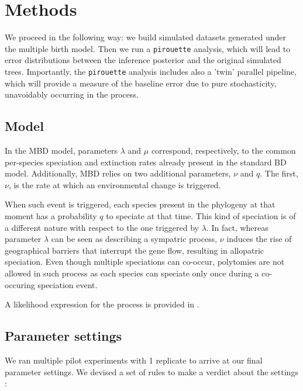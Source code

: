 \section{Methods}

We proceed in the following way: we build simulated datasets generated under the multiple birth model. Then we run a \verb;pirouette; analysis, which will lead to error distributions between the inference posterior and the original simulated trees. Importantly, the \verb;pirouette; analysis includes also a 'twin' parallel pipeline, which will provide a measure of the baseline error due to pure stochasticity, unavoidably occurring in the process.

\subsection{Model}

In the MBD model, parameters $\lambda$ and $\mu$ correspond, respectively, 
to the common per-species speciation and extinction rates 
already present in the standard BD model. 
Additionally, MBD relies on two additional parameters, $\nu$ and $q$. 
The first, $\nu$, is the rate at which an environmental change is triggered.

When such event is triggered, each species present in the phylogeny 
at that moment has a probability $q$ to speciate at that time.
This kind of speciation is of a different nature with respect to 
the one triggered by $\lambda$. 
In fact, whereas parameter $\lambda$ can be seen as 
describing a sympatric process, $\nu$ induces the rise of 
geographical barriers that interrupt the gene flow,
resulting in allopatric speciation. 
Even though multiple speciations can co-occur, 
polytomies are not allowed in such process as each species can speciate only 
once during a co-occuring speciation event.

A likelihood expression for the process is provided in \cite{mbd}.

\subsection{Parameter settings}

We ran multiple pilot experiments with 1 replicate to arrive at our final
parameter settings. We devised a set of rules to make a verdict about the
settings :

